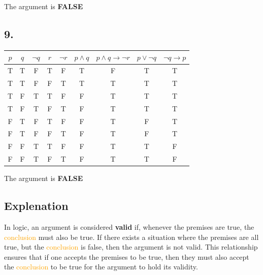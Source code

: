 \documentclass[a4paper, 10pt]{article}
\begin{document}
        The argument is \textbf{FALSE}

        \subsection*{9.}
            \begin{tabular}{|c|c|c|c|c|c|c|c|c|}
                \hline
                $p$ & $q$ & $\neg q$ & $r$ & \cellcolor{orange}$\neg r$ & $p \land q$ & \cellcolor{yellow}$p \land q \rightarrow \neg r$ & \cellcolor{yellow}$p \vee \neg q$ & \cellcolor{yellow}$ \neg q \rightarrow p$ \\
                \hline
                T & T & F & T & F & T & F & T & T \\
                \rowcolor{lightgray} T & T & F & F & T & T & T & T & T \\
                \rowcolor{lightgray} T & F & T & T & F & F & T & T & T \\
                \rowcolor{lightgray} T & F & T & F & T & F & T & T & T \\
                F & T & F & T & F & F & T & F & T \\
                F & T & F & F & T & F & T & F & T \\
                F & F & T & T & F & F & T & T & F \\
                F & F & T & F & T & F & T & T & F \\
                \hline
            \end{tabular}

            The argument is \textbf{FALSE}

        \subsection*{Explenation}
            In logic, an argument is considered \textbf{valid} if, whenever the \textcolor{darkdarkyellow}{premises} are true, the \textcolor{orange}{conclusion} must also be true. If there exists a situation where the \textcolor{darkyellow}{premises} are all true, but the \textcolor{orange}{conclusion} is false, then the argument is not valid. This relationship ensures that if one accepts the \textcolor{darkyellow}{premises} to be true, then they must also accept the \textcolor{orange}{conclusion} to be true for the argument to hold its validity.
\end{document}
